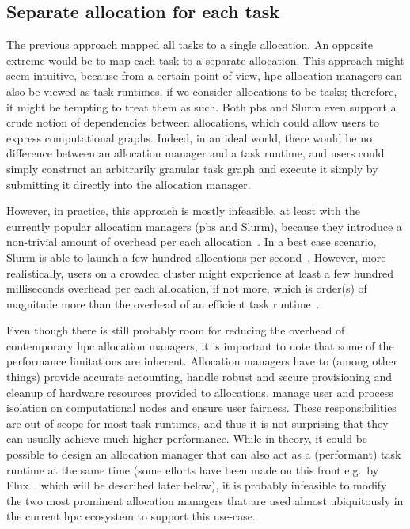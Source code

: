 \subsection*{Separate allocation for each task}
The previous approach mapped all tasks to a single allocation. An opposite extreme would be to map
each task to a separate allocation. This approach might seem intuitive, because from a certain
point of view, \gls{hpc} allocation managers can also be viewed as task runtimes, if
we consider allocations to be tasks; therefore, it might be tempting to treat them as such. Both
\gls{pbs} and Slurm even support a crude notion of dependencies between allocations,
which could allow users to express computational graphs. Indeed, in an ideal world, there would be
no difference between an allocation manager and a task runtime, and users could simply construct an
arbitrarily granular task graph and execute it simply by submitting it directly into the allocation
manager.

However, in practice, this approach is mostly infeasible, at least with the currently popular
allocation managers (\gls{pbs} and Slurm), because they introduce a non-trivial
amount of overhead per each allocation~\cite{falkon}. In a best case scenario, Slurm is
able to launch a few hundred allocations per second~\cite{slurm-throughput}. However, more
realistically, users on a crowded cluster might experience at least a few hundred milliseconds
overhead per each allocation, if not more, which is order(s) of magnitude more than the overhead of
an efficient task runtime~\cite{rsds}.

Even though there is still probably room for reducing the overhead of contemporary
\gls{hpc} allocation managers, it is important to note that some of the performance
limitations are inherent. Allocation managers have to (among other things) provide accurate
accounting, handle robust and secure provisioning and cleanup of hardware resources provided to
allocations, manage user and process isolation on computational nodes and ensure user fairness.
These responsibilities are out of scope for most task runtimes, and thus it is not surprising
that they can usually achieve much higher performance. While in theory, it could be possible to
design an allocation manager that can also act as a (performant) task runtime at the same time
(some efforts have been made on this front e.g.\ by Flux~\cite{flux}, which will be
described later below), it is probably infeasible to modify the two most prominent allocation
managers that are used almost ubiquitously in the current \gls{hpc} ecosystem to
support this use-case.

